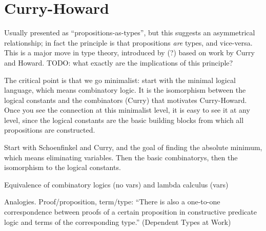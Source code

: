 \chapter{Curry-Howard}
\label{sect:curry-howard}

\begin{ednote}
  Usually presented as ``propositions-as-types'', but this suggests an
  asymmetrical relationship; in fact the principle is that
  propositions \emph{are} types, and vice-versa.  This is a major move
  in type theory, introduced by \ML(?) based on work by Curry and
  Howard.  TODO: what exactly are the implications of this principle?
\end{ednote}

\begin{ednote}
  The critical point is that we go minimalist: start with the minimal
  logical language, which means combinatory logic.  It is the
  isomorphism between the logical constants and the combinators
  (Curry) that motivates Curry-Howard.  Once you see the connection at
  this minimalist level, it is easy to see it at any level, since the
  logical constants are the basic building blocks from which all
  propositions are constructed.
\end{ednote}


\begin{ednote}
  Start with Schoenfinkel and Curry, and the goal of finding the
  absolute minimum, which means eliminating variables.  Then the basic
  combinatorys, then the isomorphism to the logical constants.

  Equivalence of combinatory logics (no vars) and lambda calculus (vars)
\end{ednote}


Analogies.  Proof/proposition, term/type: ``There is also a one-to-one
correspondence between proofs of a certain proposition in constructive
predicate logic and terms of the corresponding type.'' (Dependent Types at Work)
